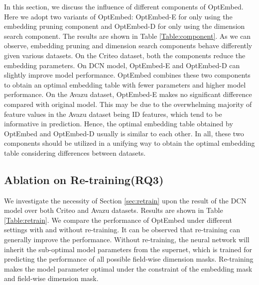 \documentclass[sigconf]{acmart}
\begin{document}
In this section, we discuss the influence of different components of OptEmbed. Here we adopt two variants of OptEmbed: OptEmbed-E for only using the embedding pruning component and OptEmbed-D for only using the dimension search component. The results are shown in Table \ref{Table:component}. As we can observe, embedding pruning and dimension search components behave differently given various datasets. On the Criteo dataset, both the components reduce the embedding parameters. On DCN model, OptEmbed-E and OptEmbed-D can slightly improve model performance. OptEmbed combines these two components to obtain an optimal embedding table with fewer parameters and higher model performance. On the Avazu dataset, OptEmbed-E makes no significant difference compared with original model. This may be due to the overwhelming majority of feature values in the Avazu dataset being ID features, which tend to be informative in prediction. Hence, the optimal embedding table obtained by OptEmbed and OptEmbed-D usually is similar to each other. In all, these two components should be utilized in a unifying way to obtain the optimal embedding table considering differences between datasets.

\subsection{Ablation on Re-training(RQ3)}
We investigate the necessity of Section \ref{sec:retrain} upon the result of the DCN model over both Criteo and Avazu datasets. Results are shown in Table \ref{Table:retrain}. We compare the performance of OptEmbed under different settings with and without re-training. It can be observed that re-training can generally improve the performance. Without re-training, the neural network will inherit the sub-optimal model parameters from the supernet, which is trained for predicting the performance of all possible field-wise dimension masks. Re-training makes the model parameter optimal under the constraint of the embedding mask and field-wise dimension mask.
\end{document}
